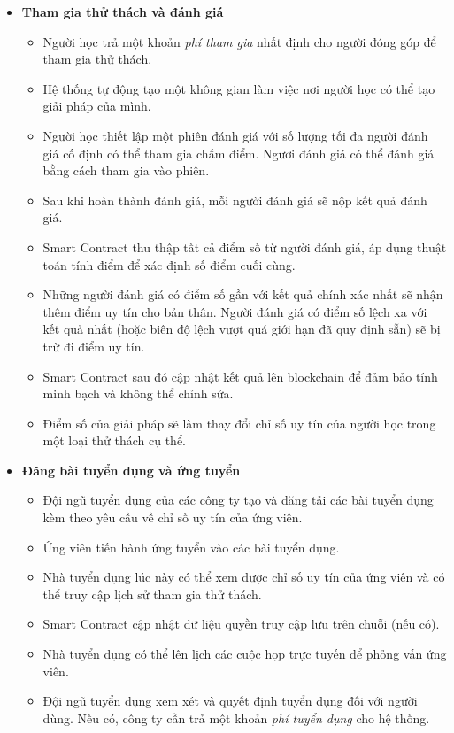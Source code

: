 \begin{itemize}
  \item \textbf{Tham gia thử thách và đánh giá}
        \begin{itemize}
          \item Người học trả một khoản \textit{phí tham gia} nhất định cho người đóng góp để tham gia thử thách.
          \item Hệ thống tự động tạo một không gian làm việc nơi người học có thể tạo giải pháp của mình.
          \item Người học thiết lập một phiên đánh giá với số lượng tối đa người đánh giá cố định có thể tham gia chấm điểm. Ngươi đánh giá có thể đánh giá bằng cách tham gia vào phiên.
          \item Sau khi hoàn thành đánh giá, mỗi người đánh giá sẽ nộp kết quả đánh giá.
          \item Smart Contract thu thập tất cả điểm số từ người đánh giá, áp dụng thuật toán tính điểm để xác định số điểm cuối cùng.
          \item Những người đánh giá có điểm số gần với kết quả chính xác nhất sẽ nhận thêm điểm uy tín cho bản thân. Người đánh giá có điểm số lệch xa với kết quả nhất (hoặc biên độ lệch vượt quá giới hạn đã quy định sẵn) sẽ bị trừ đi điểm uy tín.
          \item Smart Contract sau đó cập nhật kết quả lên blockchain để đảm bảo tính minh bạch và không thể chỉnh sửa.
          \item Điểm số của giải pháp sẽ làm thay đổi chỉ số uy tín của người học trong một loại thử thách cụ thể.
        \end{itemize}

  \item \textbf{Đăng bài tuyển dụng và ứng tuyển}
        \begin{itemize}
          \item Đội ngũ tuyển dụng của các công ty tạo và đăng tải các bài tuyển dụng kèm theo yêu cầu về chỉ số uy tín của ứng viên.
          \item Ứng viên tiến hành ứng tuyển vào các bài tuyển dụng.
          \item Nhà tuyển dụng lúc này có thể xem được chỉ số uy tín của ứng viên và có thể truy cập lịch sử tham gia thử thách.
          \item Smart Contract cập nhật dữ liệu quyền truy cập lưu trên chuỗi (nếu có).
          \item Nhà tuyển dụng có thể lên lịch các cuộc họp trực tuyến để phỏng vấn ứng viên.
          \item Đội ngũ tuyển dụng xem xét và quyết định tuyển dụng đối với người dùng. Nếu có, công ty cần trả một khoản \textit{phí tuyển dụng} cho hệ thống.
        \end{itemize}
\end{itemize}

